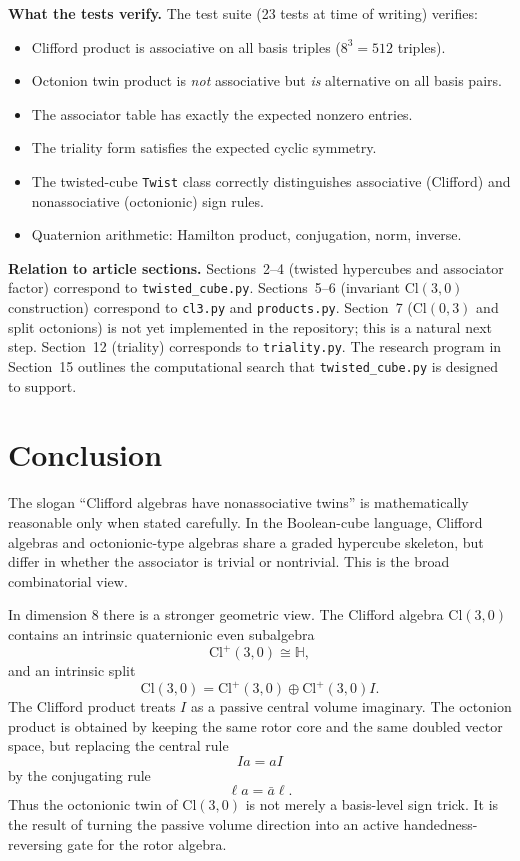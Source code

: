 \documentclass[11pt]{article}
\newcommand{\Cl}{\mathrm{Cl}}
\begin{document}
\noindent\textbf{What the tests verify.}
The test suite (23 tests at time of writing) verifies:
\begin{itemize}
    \item Clifford product is associative on all basis triples ($8^3 = 512$
    triples).
    \item Octonion twin product is \emph{not} associative but \emph{is}
    alternative on all basis pairs.
    \item The associator table has exactly the expected nonzero entries.
    \item The triality form satisfies the expected cyclic symmetry.
    \item The twisted-cube \texttt{Twist} class correctly distinguishes
    associative (Clifford) and nonassociative (octonionic) sign rules.
    \item Quaternion arithmetic: Hamilton product, conjugation, norm, inverse.
\end{itemize}

\noindent\textbf{Relation to article sections.}
Sections~2--4 (twisted hypercubes and associator factor) correspond to
\texttt{twisted\_cube.py}.
Sections~5--6 (invariant $\Cl(3,0)$ construction) correspond to
\texttt{cl3.py} and \texttt{products.py}.
Section~7 ($\Cl(0,3)$ and split octonions) is not yet implemented in the
repository; this is a natural next step.
Section~12 (triality) corresponds to \texttt{triality.py}.
The research program in Section~15 outlines the computational search that
\texttt{twisted\_cube.py} is designed to support.


\section{Conclusion}

The slogan ``Clifford algebras have nonassociative twins'' is mathematically
reasonable only when stated carefully. In the Boolean-cube language, Clifford
algebras and octonionic-type algebras share a graded hypercube skeleton, but
differ in whether the associator is trivial or nontrivial. This is the broad
combinatorial view.

In dimension $8$ there is a stronger geometric view. The Clifford algebra
$\Cl(3,0)$ contains an intrinsic quaternionic even subalgebra
\[
\Cl^+(3,0)\cong\mathbb H,
\]
and an intrinsic split
\[
\Cl(3,0)=\Cl^+(3,0)\oplus\Cl^+(3,0)I.
\]
The Clifford product treats $I$ as a passive central volume imaginary. The
octonion product is obtained by keeping the same rotor core and the same
doubled vector space, but replacing the central rule
\[
Ia=aI
\]
by the conjugating rule
\[
\ell a=\bar a\ell.
\]
Thus the octonionic twin of $\Cl(3,0)$ is not merely a basis-level sign trick.
It is the result of turning the passive volume direction into an active
handedness-reversing gate for the rotor algebra.
\end{document}
